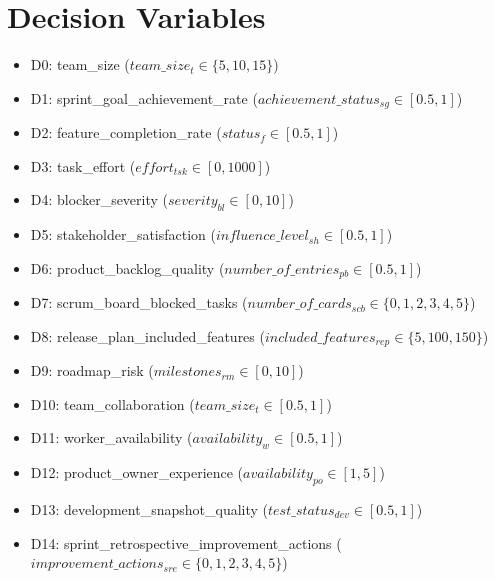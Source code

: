 \documentclass{article}
\begin{document}
\section{Decision Variables}
\begin{itemize}
    \item D0: team\_size ($team\_size_{t} \in \{5, 10, 15\}$)
    \item D1: sprint\_goal\_achievement\_rate ($achievement\_status_{sg} \in [0.5, 1]$)
    \item D2: feature\_completion\_rate ($status_{f} \in [0.5, 1]$)
    \item D3: task\_effort ($effort_{tsk} \in [0, 1000]$)
    \item D4: blocker\_severity ($severity_{bl} \in [0, 10]$)
    \item D5: stakeholder\_satisfaction ($influence\_level_{sh} \in [0.5, 1]$)
    \item D6: product\_backlog\_quality ($number\_of\_entries_{pb} \in [0.5, 1]$)
    \item D7: scrum\_board\_blocked\_tasks ($number\_of\_cards_{scb} \in \{0, 1, 2, 3, 4, 5\}$)
    \item D8: release\_plan\_included\_features ($included\_features_{rep} \in \{5, 100, 150\}$)
    \item D9: roadmap\_risk ($milestones_{rm} \in [0, 10]$)
    \item D10: team\_collaboration ($team\_size_{t} \in [0.5, 1]$)
    \item D11: worker\_availability ($availability_{w} \in [0.5, 1]$)
    \item D12: product\_owner\_experience ($availability_{po} \in [1, 5]$)
    \item D13: development\_snapshot\_quality ($test\_status_{dev} \in [0.5, 1]$)
    \item D14: sprint\_retrospective\_improvement\_actions ($improvement\_actions_{sre} \in \{0, 1, 2, 3, 4, 5\}$)
\end{itemize}
\end{document}

